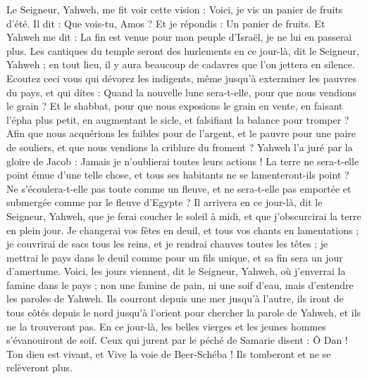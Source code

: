 \begin{multicols}{2}
\VerseOne{}Le Seigneur, Yahweh, me fit voir cette vision : Voici, je vis un panier de fruits d'été.
Il dit : Que vois-tu, Amos ? Et je répondis : Un panier de fruits. Et Yahweh me dit : La fin est venue pour mon peuple d'Israël, je ne lui en passerai plus.
Les cantiques du temple seront des hurlements en ce jour-là, dit le Seigneur, Yahweh ; en tout lieu, il y aura beaucoup de cadavres que l'on jettera en silence.
Ecoutez ceci vous qui dévorez les indigents, même jusqu'à exterminer les pauvres du pays,
et qui dites : Quand la nouvelle lune sera-t-elle, pour que nous vendions le grain ? Et le shabbat, pour que nous exposions le grain en vente, en faisant l’épha plus petit, en augmentant le sicle, et falsifiant la balance pour tromper ?
Afin que nous acquérions les faibles pour de l'argent, et le pauvre pour une paire de souliers, et que nous vendions la criblure du froment ?
Yahweh l'a juré par la gloire de Jacob : Jamais je n'oublierai toutes leurs actions !
La terre ne sera-t-elle point émue d'une telle chose, et tous ses habitants ne se lamenteront-ils point ? Ne s'écoulera-t-elle pas toute comme un fleuve, et ne sera-t-elle pas emportée et submergée comme par le fleuve d'Egypte ? 
Il arrivera en ce jour-là, dit le Seigneur, Yahweh, que je ferai coucher le soleil à midi, et que j'obscurcirai la terre en plein jour.
Je changerai vos fêtes en deuil, et tous vos chants en lamentations ; je couvrirai de sacs tous les reins, et je rendrai chauves toutes les têtes ; je mettrai le pays dans le deuil comme pour un fils unique, et sa fin sera un jour d'amertume.
Voici, les jours viennent, dit le Seigneur, Yahweh, où j'enverrai la famine dans le pays ; non une famine de pain, ni une soif d'eau, mais d'entendre les paroles de Yahweh.
Ils courront depuis une mer jusqu'à l'autre, ils iront de tous côtés depuis le nord jusqu'à l'orient pour chercher la parole de Yahweh, et ils ne la trouveront pas.
En ce jour-là, les belles vierges et les jeunes hommes s'évanouiront de soif.
Ceux qui jurent par le péché de Samarie disent : Ô Dan ! Ton dieu est vivant, et Vive la voie de Beer-Schéba ! Ils  tomberont et ne se relèveront plus.

\end{multicols}
